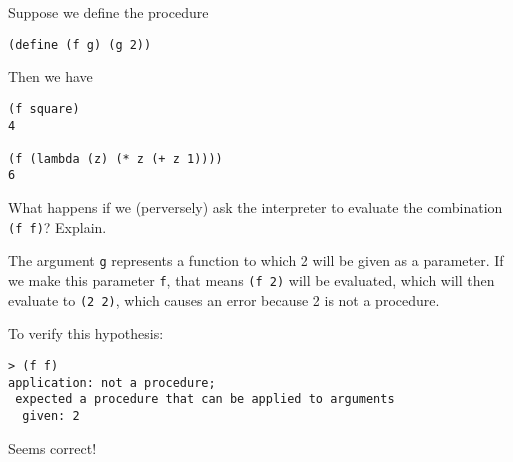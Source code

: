 \documentclass{../../sicp}
\date{August 29, 2024}
\begin{document}
\maketitle

\begin{displayquote}
	Suppose we define the procedure

	\begin{lstlisting}
(define (f g) (g 2))
  \end{lstlisting}
	Then we have
	\begin{lstlisting}
(f square)
4

(f (lambda (z) (* z (+ z 1))))
6
  \end{lstlisting}

	What happens if we (perversely) ask the interpreter to evaluate the combination \texttt{(f~f)}? Explain.

\end{displayquote}

The argument \texttt{g} represents a function to which 2 will be given as a parameter.
If we make this parameter \texttt{f}, that means \texttt{(f 2)} will be evaluated, which will then evaluate to \texttt{(2 2)}, which causes an error because 2 is not a procedure.

To verify this hypothesis:
\begin{lstlisting}
> (f f)
application: not a procedure;
 expected a procedure that can be applied to arguments
  given: 2
\end{lstlisting}

Seems correct!
\end{document}
